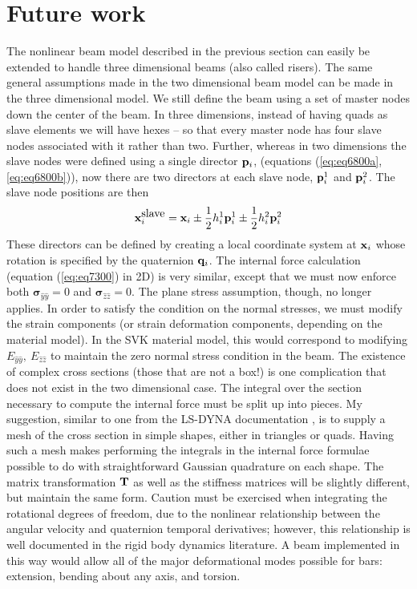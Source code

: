 \documentclass{article}
\begin{document}
\section{Future work}
The nonlinear beam model described in the previous section can easily be extended to handle three dimensional beams (also called risers).
The same general assumptions made in the two dimensional beam model can be made in the three dimensional model.
We still define the beam using a set of master nodes down the center of the beam.
In three dimensions, instead of having quads as slave elements we will have hexes -- so that every master node has four slave nodes associated with it rather than two.
Further, whereas in two dimensions the slave nodes were defined using a single director ${\bf p}_i$, (equations (\ref{eq:eq6800a}, \ref{eq:eq6800b})), now there are two directors at each slave node, ${\bf p}_i^1$ and ${\bf p}_i^2$.
The slave node positions are then 
\begin{equation} {\bf x}_i^{\mbox{slave}} = {\bf x}_i \pm \frac{1}{2}h_i^1  {\bf p}_i^1 \pm  \frac{1}{2}h_i^2  {\bf p}_i^2 \label{eq:eq11400} \end{equation}
These directors can be defined by creating a local coordinate system at ${\bf x}_i$ whose rotation is specified by the quaternion ${\bf q}_i$.
The internal force calculation (equation (\ref{eq:eq7300}) in 2D) is very similar, except that we must now enforce both $\mathbf{\sigma}_{\hat{y}\hat{y}} = 0$ and $\mathbf{\sigma}_{\hat{z}\hat{z}} = 0$.  
The plane stress assumption, though, no longer applies.  
In order to satisfy the condition on the normal stresses, we must modify the strain components (or strain deformation components, depending on the material model).
In the SVK material model, this would correspond to modifying $E_{\hat{y}\hat{y}},\ E_{\hat{z}\hat{z}}$ to maintain the zero normal stress condition in the beam.
The existence of complex cross sections (those that are not a box!) is one complication that does not exist in the two dimensional case.
The integral over the section necessary to compute the internal force must be split up into pieces.  
My suggestion, similar to one from the LS-DYNA documentation \cite{Hallquist1993}, is to supply a mesh of the cross section in simple shapes, either in triangles or quads.  
Having such a mesh makes performing the integrals in the internal force formulae possible to do with straightforward Gaussian quadrature on each shape.
The matrix transformation ${\bf T}$ as well as the stiffness matrices will be slightly different, but maintain the same form.
Caution must be exercised when integrating the rotational degrees of freedom, due to the nonlinear relationship between the angular velocity and quaternion temporal derivatives; however, this relationship is well documented in the rigid body dynamics literature.
A beam implemented in this way would allow all of the major deformational modes possible for bars: extension, bending about any axis, and torsion.
\end{document}
